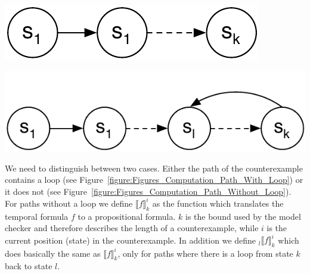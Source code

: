 \documentclass[a4paper, 12pt]{article}
\begin{document}
\begin{minipage}[t]{0.45\textwidth}
    \centering
    \vspace{0.7cm}
    \includegraphics[width=.72\textwidth]{Figures/Computation Path Without Loop}
    \label{figure:Figures_Computation_Path_Without_Loop}
\end{minipage}
\begin{minipage}[t]{0.45\textwidth}
    \centering
    \includegraphics[width=\textwidth]{Figures/Computation Path With Loop.pdf}
    \label{figure:Figures_Computation_Path_With_Loop}
\end{minipage}

We need to distinguish between two cases. Either the path of the
counterexample contains a loop (see
Figure~\ref{figure:Figures_Computation_Path_With_Loop}) or it does not (see
Figure~\ref{figure:Figures_Computation_Path_Without_Loop}). For paths without
a loop we define $⟦f⟧_k^i$ as the function which translates the temporal
formula $f$ to a propositional formula. $k$ is the bound used by the model
checker and therefore describes the length of a counterexample, while $i$ is
the current position (state) in the counterexample. In addition we define
$_l⟦f⟧_k^i$ which does basically the same as $⟦f⟧_k^i$, only for paths where
there is a loop from state $k$ back to state $l$.
\end{document}
